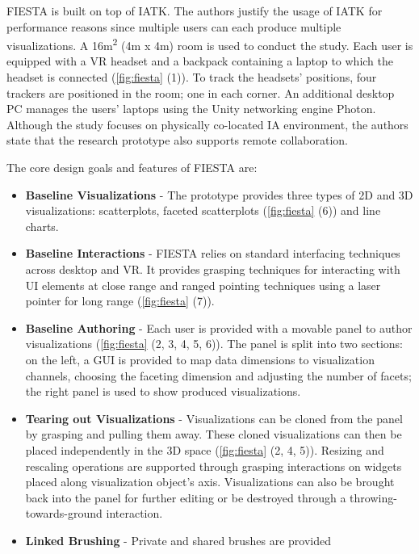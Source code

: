 \documentclass{vgtc}                          %
\begin{document}
\noindent FIESTA is built on top of IATK. The authors justify the usage of IATK
for performance reasons since multiple users can each produce multiple
visualizations. A 16m\textsuperscript{2} (4m x 4m) room is used to conduct the
study. Each user is equipped with a VR headset and a backpack containing a
laptop to which the headset is connected (\cref{fig:fiesta} (1)). To track the
headsets' positions, four trackers are positioned in the room; one in each
corner. An additional desktop PC manages the users' laptops using the Unity
networking engine Photon. Although the study focuses on physically co-located
IA environment, the authors state that the research prototype also supports
remote collaboration.

\medskip

\noindent The core design goals and features of FIESTA are:
\begin{itemize}
	\item \textbf{Baseline Visualizations} - The prototype provides three types
	      of 2D and 3D visualizations: scatterplots, faceted scatterplots
	      (\cref{fig:fiesta} (6)) and line charts.
	\item \textbf{Baseline Interactions} - FIESTA relies on standard
	      interfacing techniques across desktop and VR. It provides grasping
	      techniques for interacting with UI elements at close range and ranged
	      pointing techniques using a laser pointer for long range
	      (\cref{fig:fiesta} (7)).
	\item \textbf{Baseline Authoring} - Each user is provided with a movable
	      panel to author visualizations (\cref{fig:fiesta} (2, 3, 4, 5, 6)).
	      The panel is split into two sections: on the left, a GUI is provided
	      to map data dimensions to visualization channels, choosing the
	      faceting dimension and adjusting the number of facets; the right
	      panel is used to show produced visualizations.
	\item \textbf{Tearing out Visualizations} - Visualizations can be cloned
	      from the panel by grasping and pulling them away. These cloned
	      visualizations can then be placed independently in the 3D space
	      (\cref{fig:fiesta} (2, 4, 5)). Resizing and rescaling operations are
	      supported through grasping interactions on widgets placed along
	      visualization object's axis. Visualizations can also be brought back
	      into the panel for further editing or be destroyed through a
	      throwing-towards-ground interaction.
	\item \textbf{Linked Brushing} - Private and shared brushes are provided

\end{itemize}
\end{document}
